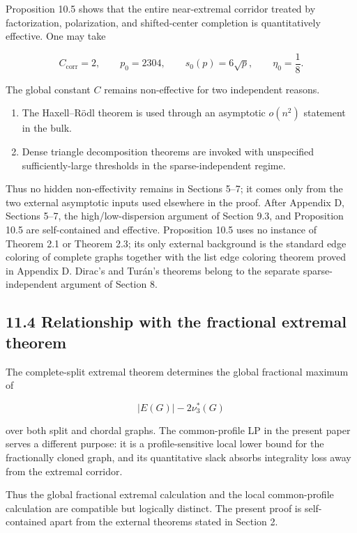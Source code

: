 \documentclass[
  11pt,
]{article}
\providecommand{\tightlist}{%
  \setlength{\itemsep}{0pt}\setlength{\parskip}{0pt}}
\begin{document}
Proposition 10.5 shows that the entire near-extremal corridor treated by factorization, polarization, and shifted-center completion is quantitatively effective. One may take

\[
C_{\mathrm{corr}}=2,
\qquad
p_0=2304,
\qquad
s_0(p)=6\sqrt p,
\qquad
\eta_0=\frac18.
\]

The global constant \(C\) remains non-effective for two independent reasons.

\begin{enumerate}
\def\labelenumi{\arabic{enumi}.}
\tightlist
\item
  The Haxell--Rödl theorem is used through an asymptotic \(o(n^2)\) statement in the bulk.
\item
  Dense triangle decomposition theorems are invoked with unspecified sufficiently-large thresholds in the sparse-independent regime.
\end{enumerate}

Thus no hidden non-effectivity remains in Sections 5--7; it comes only from the two external asymptotic inputs used elsewhere in the proof. After Appendix D, Sections 5--7, the high/low-dispersion argument of Section 9.3, and Proposition 10.5 are self-contained and effective. Proposition 10.5 uses no instance of Theorem 2.1 or Theorem 2.3; its only external background is the standard edge coloring of complete graphs together with the list edge coloring theorem proved in Appendix D. Dirac's and Turán's theorems belong to the separate sparse-independent argument of Section 8.

\subsection{11.4 Relationship with the fractional extremal theorem}\label{relationship-with-the-fractional-extremal-theorem}

The complete-split extremal theorem determines the global fractional maximum of

\[
|E(G)|-2\nu_3^*(G)
\]

over both split and chordal graphs. The common-profile LP in the present paper serves a different purpose: it is a profile-sensitive local lower bound for the fractionally cloned graph, and its quantitative slack absorbs integrality loss away from the extremal corridor.

Thus the global fractional extremal calculation and the local common-profile calculation are compatible but logically distinct. The present proof is self-contained apart from the external theorems stated in Section 2.
\end{document}
